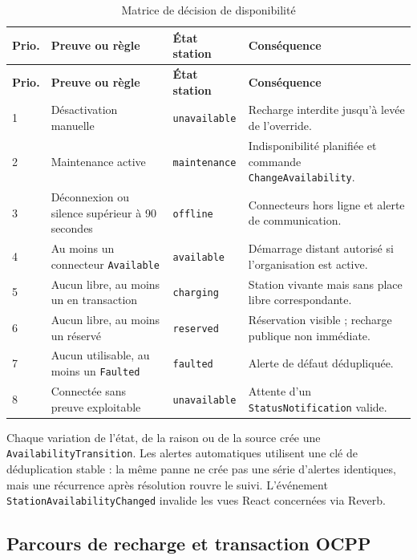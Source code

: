 \begin{longtable}{|p{1.0cm}|p{5.2cm}|p{3.5cm}|p{4.4cm}|}
  \caption{Matrice de décision de disponibilité}
  \label{tab:availability-decision-matrix}\\
  \hline
  \textbf{Prio.} & \textbf{Preuve ou règle} & \textbf{État station} &
  \textbf{Conséquence}\\
  \hline
  \endfirsthead
  \hline
  \textbf{Prio.} & \textbf{Preuve ou règle} & \textbf{État station} &
  \textbf{Conséquence}\\
  \hline
  \endhead
  1 & Désactivation manuelle & \texttt{unavailable} &
  Recharge interdite jusqu'à levée de l'override.\\\hline
  2 & Maintenance active & \texttt{maintenance} &
  Indisponibilité planifiée et commande \texttt{ChangeAvailability}.\\\hline
  3 & Déconnexion ou silence supérieur à 90 secondes & \texttt{offline} &
  Connecteurs hors ligne et alerte de communication.\\\hline
  4 & Au moins un connecteur \texttt{Available} & \texttt{available} &
  Démarrage distant autorisé si l'organisation est active.\\\hline
  5 & Aucun libre, au moins un en transaction & \texttt{charging} &
  Station vivante mais sans place libre correspondante.\\\hline
  6 & Aucun libre, au moins un réservé & \texttt{reserved} &
  Réservation visible ; recharge publique non immédiate.\\\hline
  7 & Aucun utilisable, au moins un \texttt{Faulted} & \texttt{faulted} &
  Alerte de défaut dédupliquée.\\\hline
  8 & Connectée sans preuve exploitable & \texttt{unavailable} &
  Attente d'un \texttt{StatusNotification} valide.\\
  \hline
\end{longtable}

Chaque variation de l'état, de la raison ou de la source crée une
\texttt{AvailabilityTransition}. Les alertes automatiques utilisent une clé de
déduplication stable : la même panne ne crée pas une série d'alertes identiques,
mais une récurrence après résolution rouvre le suivi. L'événement
\texttt{StationAvailabilityChanged} invalide les vues React concernées via Reverb.

\subsection{Parcours de recharge et transaction OCPP}


